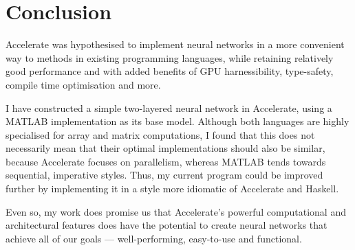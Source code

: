 \chapter{Conclusion}\label{ch:conclusion}

Accelerate was hypothesised to implement neural networks in a more convenient way to methods in existing programming languages, while retaining relatively good performance and with added benefits of GPU harnessibility, type-safety, compile time optimisation and more.

I have constructed a simple two-layered neural network in Accelerate, using a MATLAB implementation as its base model. Although both languages are highly specialised for array and matrix computations, I found that this does not necessarily mean that their optimal implementations should also be similar, because Accelerate focuses on parallelism, whereas MATLAB tends towards sequential, imperative styles. Thus, my current program could be improved further by implementing it in a style more idiomatic of Accelerate and Haskell. 

Even so, my work does promise us that Accelerate's powerful computational and architectural features does have the potential to create neural networks that achieve all of our goals --- well-performing, easy-to-use and functional.
